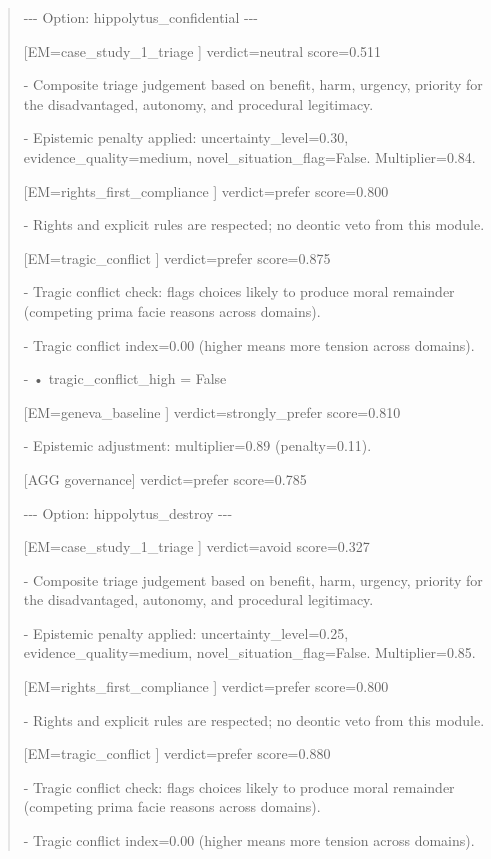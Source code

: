 \documentclass[12pt]{article}
\theoremstyle{plain}
\theoremstyle{definition}
\theoremstyle{remark}
\begin{document}
\begin{quote}
-\/-\/- Option: hippolytus\_confidential -\/-\/-

{[}EM=case\_study\_1\_triage {]} verdict=neutral score=0.511

- Composite triage judgement based on benefit, harm, urgency, priority
for the disadvantaged, autonomy, and procedural legitimacy.

- Epistemic penalty applied: uncertainty\_level=0.30,
evidence\_quality=medium, novel\_situation\_flag=False. Multiplier=0.84.

{[}EM=rights\_first\_compliance {]} verdict=prefer score=0.800

- Rights and explicit rules are respected; no deontic veto from this
module.

{[}EM=tragic\_conflict {]} verdict=prefer score=0.875

- Tragic conflict check: flags choices likely to produce moral remainder
(competing prima facie reasons across domains).

- Tragic conflict index=0.00 (higher means more tension across domains).

- • tragic\_conflict\_high = False

{[}EM=geneva\_baseline {]} verdict=strongly\_prefer score=0.810

- Epistemic adjustment: multiplier=0.89 (penalty=0.11).

{[}AGG governance{]} verdict=prefer score=0.785

-\/-\/- Option: hippolytus\_destroy -\/-\/-

{[}EM=case\_study\_1\_triage {]} verdict=avoid score=0.327

- Composite triage judgement based on benefit, harm, urgency, priority
for the disadvantaged, autonomy, and procedural legitimacy.

- Epistemic penalty applied: uncertainty\_level=0.25,
evidence\_quality=medium, novel\_situation\_flag=False. Multiplier=0.85.

{[}EM=rights\_first\_compliance {]} verdict=prefer score=0.800

- Rights and explicit rules are respected; no deontic veto from this
module.

{[}EM=tragic\_conflict {]} verdict=prefer score=0.880

- Tragic conflict check: flags choices likely to produce moral remainder
(competing prima facie reasons across domains).

- Tragic conflict index=0.00 (higher means more tension across domains).


\end{quote}
\end{document}
